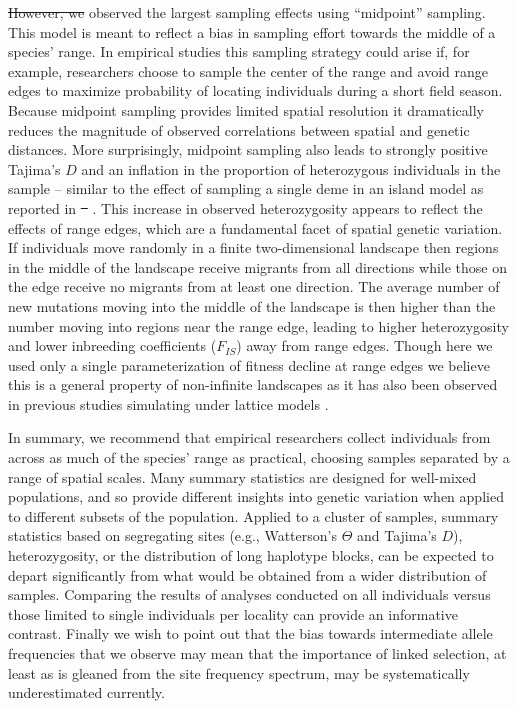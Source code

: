 \documentclass[10pt,twoside,lineno,hidelinks]{preprint} %
\providecommand{\DIFadd}[1]{{\protect\color{blue}\uwave{#1}}} %
\providecommand{\DIFdel}[1]{{\protect\color{red}\sout{#1}}}                      %
\providecommand{\DIFaddbegin}{} %
\providecommand{\DIFaddend}{} %
\providecommand{\DIFdelbegin}{} %
\providecommand{\DIFdelend}{} %
\begin{document}
\DIFdelbegin \DIFdel{However, we }\DIFdelend \DIFaddbegin \DIFadd{We }\DIFaddend observed the largest sampling effects using ``midpoint'' sampling.
This model is meant to reflect a bias in sampling effort towards the middle of a species' range. 
In empirical studies this sampling strategy could arise if, for example, 
researchers choose to sample the center of the range and avoid range edges to maximize probability of locating individuals during a short field season. 
Because midpoint sampling provides limited spatial resolution it dramatically reduces the magnitude of observed correlations between spatial and genetic distances. 
More surprisingly, midpoint sampling also leads to strongly positive Tajima's $D$ and an inflation in the proportion of heterozygous individuals in the sample -- similar to the effect of sampling a single deme in an island model as reported in \DIFdelbegin \DIFdel{\mbox{%
\citep{Stadler2009}}\hspace{0pt}%
}\DIFdelend \DIFaddbegin \DIFadd{\mbox{%
\citet{Stadler2009}}\hspace{0pt}%
}\DIFaddend . 
This increase in observed heterozygosity appears to reflect the effects of range edges, which are a fundamental facet of spatial genetic variation. 
If individuals move randomly in a finite two-dimensional landscape then regions in the middle of the landscape receive migrants from all directions while those on the edge receive no migrants from at least one direction. The average number of new mutations moving into the middle of the landscape is then higher than the number moving into regions near the range edge, leading to higher heterozygosity and lower inbreeding coefficients ($F_{IS}$) away from range edges. Though here we used only a single parameterization of fitness decline at range edges we believe this is a general property of non-infinite landscapes as it has also been observed in previous studies simulating under lattice models \citep{Neel2013,Shirk2014}. 

In summary, 
we recommend that empirical researchers collect individuals from across as much of the species' range as practical,
choosing samples separated by a range of spatial scales.
Many summary statistics are designed for well-mixed populations,
and so provide different insights into genetic variation
when applied to different subsets of the population.
Applied to a cluster of samples, summary statistics based on segregating sites 
(e.g., Watterson's \DIFdelbegin \DIFdel{$\Theta$ }\DIFdelend \DIFaddbegin \DIFadd{$\theta$ }\DIFaddend and Tajima's $D$), 
heterozygosity, or the distribution of long haplotype blocks, 
can be expected to depart significantly from what would be obtained from a wider distribution of samples.
Comparing the results of analyses conducted on all individuals versus those limited to single individuals per locality 
can provide an informative contrast. Finally we wish to point out that the bias towards intermediate allele frequencies that we observe may mean that the importance of linked selection, at least as is gleaned from the site frequency spectrum, may be systematically underestimated currently.
\end{document}
